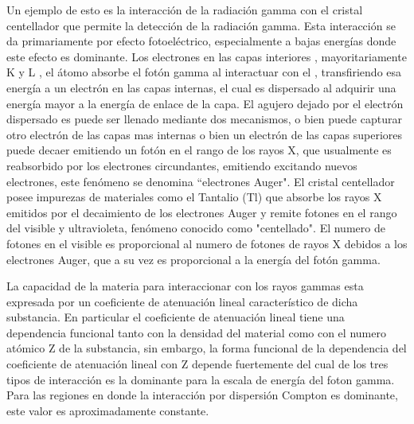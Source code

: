 \documentclass[twoside]{article}
\begin{document}
\begin{multicols}{2}
Un ejemplo de esto es la interacción de la radiación gamma con el cristal centellador que permite la detección de la radiación gamma. Esta interacción se da primariamente por efecto fotoeléctrico, especialmente a bajas energías donde este efecto es dominante. Los electrones en las capas interiores , mayoritariamente K y L , el átomo absorbe el fotón gamma al interactuar con el , transfiriendo esa energía a un electrón en las capas internas, el cual es dispersado al adquirir una energía mayor a la energía de enlace de la capa. El agujero dejado por el electrón dispersado es puede ser llenado mediante dos mecanismos, o bien puede capturar otro electrón de las capas mas internas o bien un electrón de las capas superiores puede decaer emitiendo un fotón en el rango de los rayos X, que usualmente es reabsorbido por los electrones circundantes, emitiendo excitando nuevos electrones, este fenómeno se denomina ``electrones Auger". El cristal centellador posee impurezas de materiales como el Tantalio (Tl) que absorbe los rayos X emitidos por el decaimiento de los electrones Auger y remite fotones en el rango del visible y ultravioleta, fenómeno conocido como "centellado". El numero de fotones en el visible es proporcional al numero de fotones de rayos X debidos a los electrones Auger, que a su vez es proporcional a la energía del fotón gamma.

La capacidad de la materia para interaccionar con los rayos gammas esta expresada por un coeficiente de atenuación lineal característico de dicha substancia. En particular el coeficiente de atenuación lineal tiene una dependencia funcional tanto con la densidad del material como con el numero atómico Z de la substancia, sin embargo, la forma funcional de la dependencia del coeficiente de atenuación lineal con Z depende fuertemente del cual de los tres tipos de interacción es la dominante para la escala de energía del foton gamma. Para las regiones en donde la interacción por dispersión Compton es dominante, este valor es aproximadamente constante.  
\fi



\end{multicols}
\end{document}
